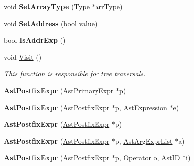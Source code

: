 \begin{DoxyCompactItemize}
\item 
\hypertarget{classAstPostfixExpr_aa5d70d77be68a21aa2f30a6c276e7453}{void {\bfseries Set\-Array\-Type} (\hyperlink{classType}{Type} $\ast$arr\-Type)}\label{classAstPostfixExpr_aa5d70d77be68a21aa2f30a6c276e7453}

\item 
\hypertarget{classAstPostfixExpr_a8999a89a30f416241a29e7f8b8b0e948}{void {\bfseries Set\-Address} (bool value)}\label{classAstPostfixExpr_a8999a89a30f416241a29e7f8b8b0e948}

\item 
\hypertarget{classAstPostfixExpr_a84889c2ddd3eabd0966e08f85a2576c4}{bool {\bfseries Is\-Addr\-Exp} ()}\label{classAstPostfixExpr_a84889c2ddd3eabd0966e08f85a2576c4}

\item 
void \hyperlink{classAstPostfixExpr_ae3e7fdbd4c2bf888ee62760e6f422cad}{Visit} ()
\begin{DoxyCompactList}\small\item\em This function is responsible for tree traversals. \end{DoxyCompactList}\item 
\hypertarget{classAstPostfixExpr_a8299517f87239b0428545cdfc96f0bbc}{{\bfseries Ast\-Postfix\-Expr} (\hyperlink{classAstPrimaryExpr}{Ast\-Primary\-Expr} $\ast$p)}\label{classAstPostfixExpr_a8299517f87239b0428545cdfc96f0bbc}

\item 
\hypertarget{classAstPostfixExpr_a5dd762cbae8160f94a661ecdf3a90770}{{\bfseries Ast\-Postfix\-Expr} (\hyperlink{classAstPostfixExpr}{Ast\-Postfix\-Expr} $\ast$p, \hyperlink{classAstExpression}{Ast\-Expression} $\ast$e)}\label{classAstPostfixExpr_a5dd762cbae8160f94a661ecdf3a90770}

\item 
\hypertarget{classAstPostfixExpr_af17b325f38a7138728773d86a9342105}{{\bfseries Ast\-Postfix\-Expr} (\hyperlink{classAstPostfixExpr}{Ast\-Postfix\-Expr} $\ast$p)}\label{classAstPostfixExpr_af17b325f38a7138728773d86a9342105}

\item 
\hypertarget{classAstPostfixExpr_a4a1ae7a03b7b29e6641f47479e58aa3b}{{\bfseries Ast\-Postfix\-Expr} (\hyperlink{classAstPostfixExpr}{Ast\-Postfix\-Expr} $\ast$p, \hyperlink{classAstArgExprList}{Ast\-Arg\-Expr\-List} $\ast$a)}\label{classAstPostfixExpr_a4a1ae7a03b7b29e6641f47479e58aa3b}

\item 
\hypertarget{classAstPostfixExpr_a094735e6e2f593a42cc2b9aabc44213b}{{\bfseries Ast\-Postfix\-Expr} (\hyperlink{classAstPostfixExpr}{Ast\-Postfix\-Expr} $\ast$p, Operator o, \hyperlink{classAstID}{Ast\-I\-D} $\ast$i)}\label{classAstPostfixExpr_a094735e6e2f593a42cc2b9aabc44213b}


\end{DoxyCompactItemize}
